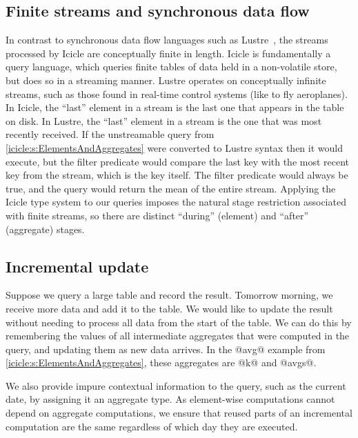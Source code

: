 \subsection{Finite streams and synchronous data flow}
In contrast to synchronous data flow languages such as {\sc Lustre}~\cite{halbwachs1991synchronous}, the streams processed by Icicle are conceptually finite in length.
Icicle is fundamentally a query language, which queries finite tables of data held in a non-volatile store, but does so in a streaming manner.
{\sc Lustre} operates on conceptually infinite streams, such as those found in real-time control systems (like to fly aeroplanes).
In Icicle, the ``last'' element in a stream is the last one that appears in the table on disk.
In {\sc Lustre}, the ``last'' element in a stream is the one that was most recently received.
If the unstreamable query from \cref{icicle:s:ElementsAndAggregates} were converted to {\sc Lustre} syntax then it would execute, but the filter predicate would compare the last key with the most recent key from the stream, which is the key itself.
The filter predicate would always be true, and the query would return the mean of the entire stream.
Applying the Icicle type system to our queries imposes the natural stage restriction associated with finite streams, so there are distinct ``during'' (element) and ``after'' (aggregate) stages.


\subsection{Incremental update}
Suppose we query a large table and record the result.
Tomorrow morning, we receive more data and add it to the table.
We would like to update the result without needing to process all data from the start of the table.
We can do this by remembering the values of all intermediate aggregates that were computed in the query, and updating them as new data arrives.
In the @avg@ example from \cref{icicle:s:ElementsAndAggregates}, these aggregates are @k@ and @avgs@. 

We also provide impure contextual information to the query, such as the current date, by assigning it an aggregate type.
As element-wise computations cannot depend on aggregate computations, we ensure that reused parts of an incremental computation are the same regardless of which day they are executed.


